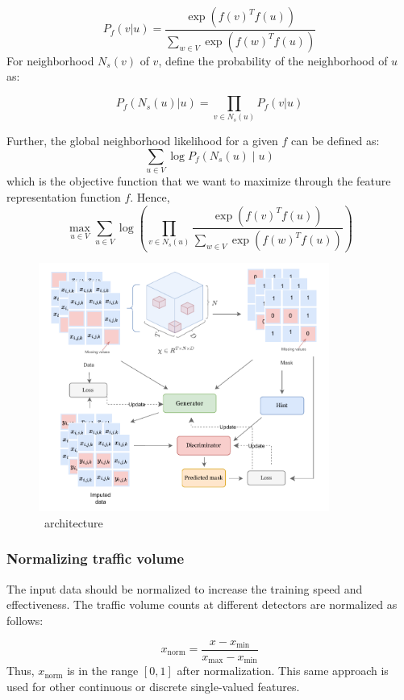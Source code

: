\begin{enumerate}[(i)]
    \[
        P_f(v|u) = \frac{\exp(f(v)^T f(u))}{\sum_{w \in V} \exp(f(w)^T f(u))} \tag{1}
    \]
    For neighborhood \( N_s(v) \) of \( v \), define the probability of the neighborhood of \( u \) as:
    
    \[ P_f(N_s(u)|u) = \prod_{v \in N_s(u)} P_f(v|u) \tag{2} \]

    Further, the global neighborhood likelihood for a given \( f \) can be defined as:
\[ \sum_{u \in V} \log P_f(N_s(u) \mid u) \tag{3} \]
which is the objective function that we want to maximize through the feature representation function \(f\). Hence,
\[ \max_{u \in V} \sum_{u \in V} \log \left( \prod_{v \in N_s(u)} \frac{\exp(f(v)^T f(u))}{\sum_{w \in V} \exp(f(w)^T f(u))} \right) \tag{4} \]

\end{enumerate}

\begin{figure}[htbp]
  \centering
  \includegraphics[width=0.85\textwidth]{model.pdf}
  \caption{\name \ architecture}
  \label{fig:architecture}
\end{figure}

\subsubsection{Normalizing traffic volume}\label{subsubsec:normal}
The input data should be normalized to increase the training speed and effectiveness. The traffic volume counts at different detectors are normalized as follows:

\[ x_{\text{norm}} = \frac{x - x_{\text{min}}}{x_{\text{max}} - x_{\text{min}}} \]
Thus, \( x_{\text{norm}} \) is in the range \([0,1]\) after normalization.
This same approach is used for other continuous or discrete single-valued features.


